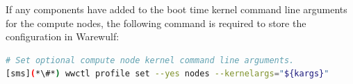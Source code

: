 \noindent If any components have added to the boot time kernel command line arguments for the compute nodes,
the following command is required to store the configuration in Warewulf:
\begin{lstlisting}[language=bash,keywords={},upquote=true,basicstyle=\footnotesize\ttfamily]
# Set optional compute node kernel command line arguments.
[sms](*\#*) wwctl profile set --yes nodes --kernelargs="${kargs}"
\end{lstlisting}
